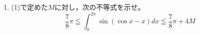 \documentclass[../../main.tex]{subfiles}
\begin{document}
\begin{enumerate}
  $\displaystyle f(\theta)=\sin\theta-\theta+\frac{{\theta}^3}{6}$の区間
    $-1\leqq\theta\leqq1$における最大値$M$および最小値$m$を求めよ。
  \item(1)で定めた$M$に対し，次の不等式を示せ。
    \[ \frac{7}{8}\pi \leqq \int_0^{2\pi}\sin(\cos x-x)dx \leqq \frac{7}{8}\pi+4M \]
\end{enumerate}
\end{document}
